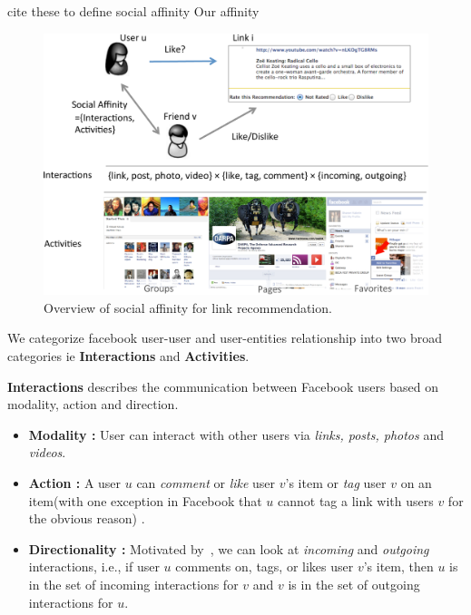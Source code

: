 

cite these to define social affinity
Our affinity
\cite{Panigrahy2012ubr}
\cite{Goel2012structure}
\cite{Wilson2012BSG}

\begin{figure}[t!]
\centering
\includegraphics[width=.95\linewidth]{data/overview}
\caption{Overview of social affinity for link recommendation.}
\label{fig:overview}
\end{figure}


We categorize facebook user-user and user-entities relationship into two broad categories ie \textbf{Interactions} and \textbf{Activities}.

{\bf Interactions} describes the communication between Facebook users based on modality, action and direction.
\begin{itemize}
\item \textbf{Modality :}  User can interact with other users via
									 \textit{links, posts, photos} and \textit{videos}.
\item \textbf{Action :}  A user $u$ can \textit{comment} or \textit{like} 
									user $v$'s item or \textit{tag} user $v$ on an 
									item(with one exception in Facebook that $u$ cannot tag a 
									link with users $v$ for the obvious reason) .
\item \textbf{Directionality :} Motivated by~\cite{saez2011high}, we can look
      								at \textit{incoming} and \textit{outgoing} interactions, i.e.,
      								if user $u$ comments on, tags, or likes user $v$'s item,
      								then $u$ is in the set of incoming interactions for $v$
      								and $v$ is in the set of outgoing interactions for $u$.
      								
\end{itemize}								

